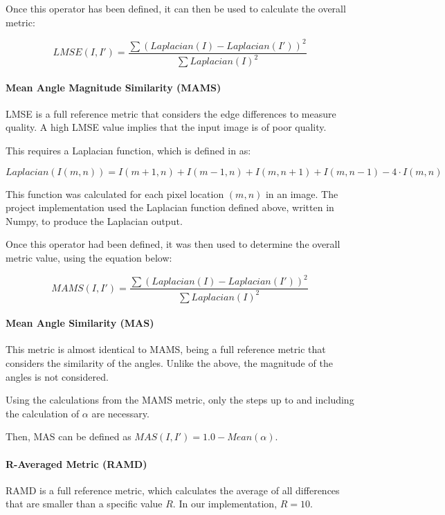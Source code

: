 \documentclass[12pt,a4paper]{article}
\begin{document}
                Once this operator has been defined, it can then be used to calculate the overall metric: 

                $$LMSE(I, I') = \frac{\sum (Laplacian(I) - Laplacian(I'))^2}{\sum Laplacian(I)^2}$$
                
            \paragraph{Mean Angle Magnitude Similarity (MAMS)}
            LMSE is a full reference metric that considers the edge differences to measure quality. A high LMSE value implies that the input image is of poor quality. 
                
            This requires a Laplacian function, which is defined in \cite{LMSEPaper} as:

            $$Laplacian(I(m, n)) = I(m+1, n) + I(m-1, n) + I(m, n+1) + I(m, n-1) - 4\cdot I(m, n)$$

            This function was calculated for each pixel location $(m, n)$ in an image. The project implementation used the Laplacian function defined above, written in Numpy, to produce the Laplacian output. 
            \cite{LMSEPaper}

            Once this operator had been defined, it was then used to determine the overall metric value, using the equation below:

            $$MAMS(I, I') = \frac{\sum (Laplacian(I) - Laplacian(I'))^2}{\sum Laplacian(I)^2}$$

            \paragraph{Mean Angle Similarity (MAS)}
            This metric is almost identical to MAMS, being a full reference metric that considers the similarity of the angles. Unlike the above, the magnitude of the angles is not considered.

            Using the calculations from the MAMS metric, only the steps up to and including the calculation of $\alpha$ are necessary. 

            Then, MAS can be defined as $MAS(I, I') = 1.0 - Mean(\alpha)$.

            \paragraph{R-Averaged Metric (RAMD)}
                RAMD is a full reference metric, which calculates the average of all differences that are smaller than a specific value $R$.
                In our implementation, $R=10$.
\end{document}
